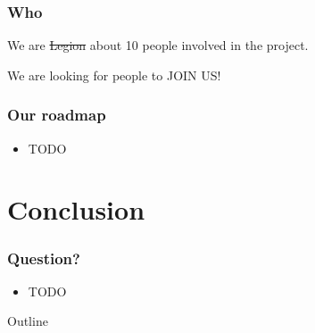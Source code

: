 \documentclass{beamer}
\begin{document}
\begin{frame}
    \frametitle{Who}

    We are \sout{Legion} about 10 people involved in the project.

    \pause
    We are looking for people to JOIN US!
\end{frame}

\begin{frame}
    \frametitle{Our roadmap}
    \begin{itemize}
        \item TODO
    \end{itemize}
\end{frame}

\section{Conclusion}

\begin{frame}
    \frametitle{Question?}
    
    \begin{itemize}
        \item TODO
    \end{itemize}
\end{frame}

\begin{frame}[shrink=20]{Outline}

    \tableofcontents
\end{frame}
\end{document}

